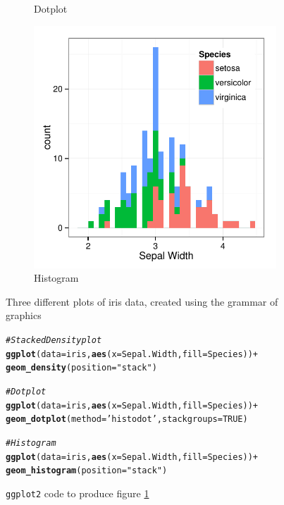 \documentclass[11pt]{isuthesis}\usepackage[]{graphicx}\usepackage[]{color}
\makeatletter
\newcommand{\hlnum}[1]{\textcolor[rgb]{0.686,0.059,0.569}{#1}}%
\newcommand{\hlstr}[1]{\textcolor[rgb]{0.192,0.494,0.8}{#1}}%
\newcommand{\hlcom}[1]{\textcolor[rgb]{0.678,0.584,0.686}{\textit{#1}}}%
\newcommand{\hlopt}[1]{\textcolor[rgb]{0,0,0}{#1}}%
\newcommand{\hlstd}[1]{\textcolor[rgb]{0.345,0.345,0.345}{#1}}%
\newcommand{\hlkwc}[1]{\textcolor[rgb]{0.333,0.667,0.333}{#1}}%
\newcommand{\hlkwd}[1]{\textcolor[rgb]{0.737,0.353,0.396}{\textbf{#1}}}%
\newenvironment{kframe}{%
 \def\at@end@of@kframe{}%
 \ifinner\ifhmode%
  \def\at@end@of@kframe{\end{minipage}}%
  \begin{minipage}{\columnwidth}%
 \fi\fi%
 \def\FrameCommand##1{\hskip\@totalleftmargin \hskip-\fboxsep
 \colorbox{shadecolor}{##1}\hskip-\fboxsep
     \hskip-\linewidth \hskip-\@totalleftmargin \hskip\columnwidth}%
 \MakeFramed {\advance\hsize-\width
   \@totalleftmargin\z@ \linewidth\hsize
   \@setminipage}}%
 {\par\unskip\endMakeFramed%
 \at@end@of@kframe}
\newenvironment{knitrout}{}{} %
\makeatother
\begin{document}
\begin{figure}[htbp]
\begin{subfigure}[b]{.33\linewidth}
  \caption{Dotplot}
\end{subfigure}\hfill
\begin{subfigure}[b]{.33\linewidth}\centering
  \includegraphics[width=\linewidth]{fig-irisdatagrammar-3}
  \caption{Histogram}
\end{subfigure}\hfill
\caption{Three different plots of iris data, created using the grammar of graphics}\label{fig:grammarplots}
\end{figure}

\begin{figure}[htbp]\centering
\begin{knitrout}
\color{fgcolor}\begin{kframe}
\begin{alltt}
\hlcom{# Stacked Density plot}
\hlkwd{ggplot}\hlstd{(}\hlkwc{data}\hlstd{=iris,} \hlkwd{aes}\hlstd{(}\hlkwc{x}\hlstd{=Sepal.Width,} \hlkwc{fill}\hlstd{=Species))} \hlopt{+}
  \hlkwd{geom_density}\hlstd{(}\hlkwc{position}\hlstd{=}\hlstr{"stack"}\hlstd{)}

\hlcom{# Dotplot }
\hlkwd{ggplot}\hlstd{(}\hlkwc{data}\hlstd{=iris,} \hlkwd{aes}\hlstd{(}\hlkwc{x}\hlstd{=Sepal.Width,} \hlkwc{fill}\hlstd{=Species))} \hlopt{+}
  \hlkwd{geom_dotplot}\hlstd{(}\hlkwc{method}\hlstd{=}\hlstr{'histodot'}\hlstd{,} \hlkwc{stackgroups}\hlstd{=}\hlnum{TRUE}\hlstd{)}

\hlcom{# Histogram}
\hlkwd{ggplot}\hlstd{(}\hlkwc{data}\hlstd{=iris,} \hlkwd{aes}\hlstd{(}\hlkwc{x}\hlstd{=Sepal.Width,} \hlkwc{fill}\hlstd{=Species))} \hlopt{+}
  \hlkwd{geom_histogram}\hlstd{(}\hlkwc{position}\hlstd{=}\hlstr{"stack"}\hlstd{)}
\end{alltt}
\end{kframe}
\end{knitrout}
\caption[Ggplot2 code demonstrating the grammar of graphics]{\texttt{ggplot2} code to produce figure \protect\ref{fig:grammarplots}}\label{fig:grammarcode}
\end{figure}
\end{document}

